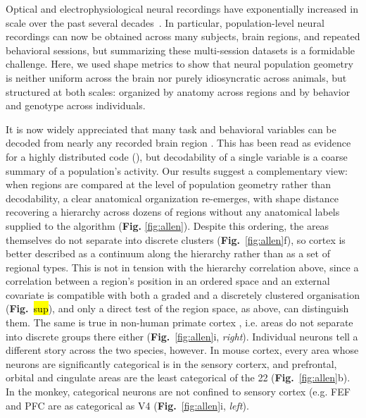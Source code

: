 Optical and electrophysiological neural recordings have exponentially increased in scale over the past several decades~\parencite{stevenson2011advances,urai2022large}.
In particular, population-level neural recordings can now be obtained across many subjects, brain regions, and repeated behavioral sessions, but summarizing these multi-session datasets is a formidable challenge.
Here, we used shape metrics to show that neural population geometry is neither uniform across the brain nor purely idiosyncratic across animals, but structured at both scales: organized by anatomy across regions and by behavior and genotype across individuals.

It is now widely appreciated that many task and behavioral variables can be decoded from nearly any recorded brain region \parencite{steinmetz2019distributed,stringer2019spontaneous,musall2019,angelaki2025brain, Lloreda2025,rosen2026distributed}.
This has been read as evidence for a highly distributed code (\textcite{hayden2026rethinking,fine2021whole,Lloreda2025}), but decodability of a single variable is a coarse summary of a population's activity. Our results suggest a complementary view: when regions are compared at the level of population geometry rather than decodability, a clear anatomical organization re-emerges, with shape distance recovering a hierarchy across dozens of regions without any anatomical labels supplied to the algorithm (\textbf{Fig.} \ref{fig:allen}). Despite this ordering, the areas themselves do not separate into discrete clusters (\textbf{Fig.}~\ref{fig:allen}f), so cortex is better described as a continuum along the hierarchy rather than as a set of regional types. This is not in tension with the hierarchy correlation above, since a correlation between a region's position in an ordered space and an external covariate is compatible with both a graded and a discretely clustered organisation (\textbf{Fig.}~\hl{sup}), and only a direct test of the region space, as above, can distinguish them. The same is true in non-human primate cortex \parencite{Siegel2015-cz}, i.e. areas do not separate into discrete groups there either (\textbf{Fig.}~\ref{fig:allen}i, \textit{right}). Individual neurons tell a different story across the two species, however. In mouse cortex, every area whose neurons are significantly categorical is in the sensory corterx, and prefrontal, orbital and cingulate areas are the least categorical of the 22 (\textbf{Fig.}~\ref{fig:allen}b). In the monkey, categorical neurons are not confined to sensory cortex (e.g. FEF and PFC are as categorical as V4 (\textbf{Fig.}~\ref{fig:allen}i, \textit{left}). 

